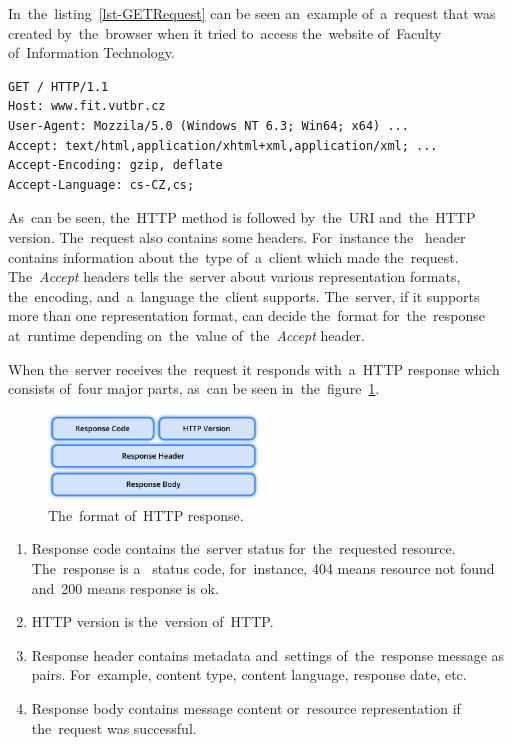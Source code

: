 In~the~listing~\ref{lst-GETRequest} can be seen an~example of~a~request that was
created by~the~browser when it tried to~access the~website of~Faculty
of~Information Technology.

\vspace{1mm}
\begin{lstlisting}[caption=An~example of~a~simplified GET request made
by~the~browser., label=lst-GETRequest, style=dp-default]
GET / HTTP/1.1
Host: www.fit.vutbr.cz
User-Agent: Mozzila/5.0 (Windows NT 6.3; Win64; x64) ...
Accept: text/html,application/xhtml+xml,application/xml; ...
Accept-Encoding: gzip, deflate
Accept-Language: cs-CZ,cs;
\end{lstlisting}

As~can be seen, the~HTTP method is followed by~the~URI and~the~HTTP version.
The~request also contains some headers. For~instance
the~ header contains information about the~type
of~a~client which made the~request. The~\textit{Accept} headers tells the~server
about various representation formats, the~encoding, and~a~language the~client
supports. The~server, if it supports more than one representation format, can
decide the~format for~the~response at~runtime depending on~the~value
of~the~\textit{Accept} header.

When the~server receives the~request it responds with~a~HTTP response which
consists of~four major parts, as~can be seen
in~the~figure~\ref{fig-HTTPResponse}.

\begin{figure}[!hbt]
	\centering
	\includegraphics[width=0.5\textwidth]{./figures/http-response.pdf}
	\caption{The~format of~HTTP response.}
	\label{fig-HTTPResponse}
\end{figure}

\begin{enumerate}
  \item Response code contains the~server status for~the~requested resource.
  The~response is a~ status code, for~instance, 404 means resource
  not found and~200 means response is ok.
  \item HTTP version is the~version of~HTTP.
  \item Response header contains metadata and~settings of~the~response message
  as~ pairs. For~example, content type, content language,
  response date, etc.
  \item Response body contains message content or~resource representation if
  the~request was successful.
\end{enumerate}


